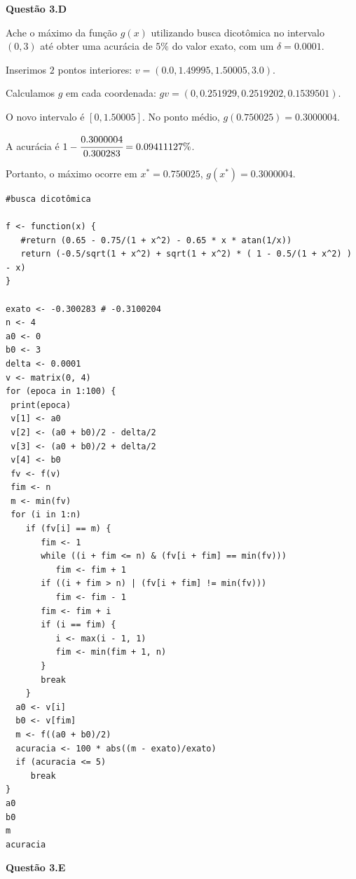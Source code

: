 \documentclass{rbfin}
\begin{document}
\vspace{6mm}

\large

\textbf{Questão 3.D}

\normalsize

\vspace{6mm}

\doublespacing

Ache o máximo da função $g(x)$ utilizando busca dicotômica no intervalo $(0, 3)$ até obter uma acurácia de $5\%$ do valor exato, com um $\delta = 0.0001$.

Inserimos $2$ pontos interiores: $v = (0.0, 1.49995, 1.50005, 3.0)$.

Calculamos $g$ em cada coordenada: $gv = (0, 0.251929, 0.2519202, 0.1539501)$.

O novo intervalo é $[0, 1.50005]$. No ponto médio, $g(0.750025) = 0.3000004$.

A acurácia é $1 - \cfrac{0.3000004}{0.300283} = 0.09411127\%$.

Portanto, o máximo ocorre em $x^* = 0.750025$, $g(x^*) = 0.3000004$.

\newpage

\singlespacing

\begin{verbatim}
#busca dicotômica

f <- function(x) {
   #return (0.65 - 0.75/(1 + x^2) - 0.65 * x * atan(1/x))
   return (-0.5/sqrt(1 + x^2) + sqrt(1 + x^2) * ( 1 - 0.5/(1 + x^2) ) - x)
}

exato <- -0.300283 # -0.3100204   
n <- 4
a0 <- 0
b0 <- 3
delta <- 0.0001
v <- matrix(0, 4)
for (epoca in 1:100) {
 print(epoca)
 v[1] <- a0
 v[2] <- (a0 + b0)/2 - delta/2
 v[3] <- (a0 + b0)/2 + delta/2
 v[4] <- b0
 fv <- f(v)
 fim <- n
 m <- min(fv)
 for (i in 1:n)
    if (fv[i] == m) {
       fim <- 1
       while ((i + fim <= n) & (fv[i + fim] == min(fv)))
          fim <- fim + 1
       if ((i + fim > n) | (fv[i + fim] != min(fv)))
          fim <- fim - 1
       fim <- fim + i
       if (i == fim) {
          i <- max(i - 1, 1)
          fim <- min(fim + 1, n)
       }
       break
    }
  a0 <- v[i]
  b0 <- v[fim]
  m <- f((a0 + b0)/2)
  acuracia <- 100 * abs((m - exato)/exato)
  if (acuracia <= 5)
     break
}
a0
b0
m
acuracia
\end{verbatim}

\vspace{6mm}

\large

\textbf{Questão 3.E}
\end{document}
